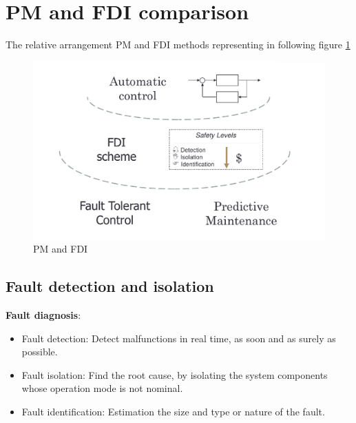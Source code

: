 \documentclass[class=article, crop=false]{standalone}
\begin{document}
\section{PM and FDI comparison}






The relative arrangement PM and FDI methods representing in following
figure \ref{fig:fdi_pm}
\begin{figure}[h!]
    \centering
    \includegraphics[scale=0.3]{FDI_PM.png}
    \caption{PM and FDI }
    \label{fig:fdi_pm}
\end{figure}

\subsection{Fault detection and isolation}



 
\textbf{Fault diagnosis}:
\begin{itemize}
    \item{Fault detection: Detect malfunctions in real time, as soon and as
        surely as possible.}
    \item{Fault isolation: Find the root cause, by isolating the system
        components whose operation mode is not nominal.}
    \item{Fault identification: Estimation the size and type or nature of the
        fault.}
\end{itemize}
\end{document}
